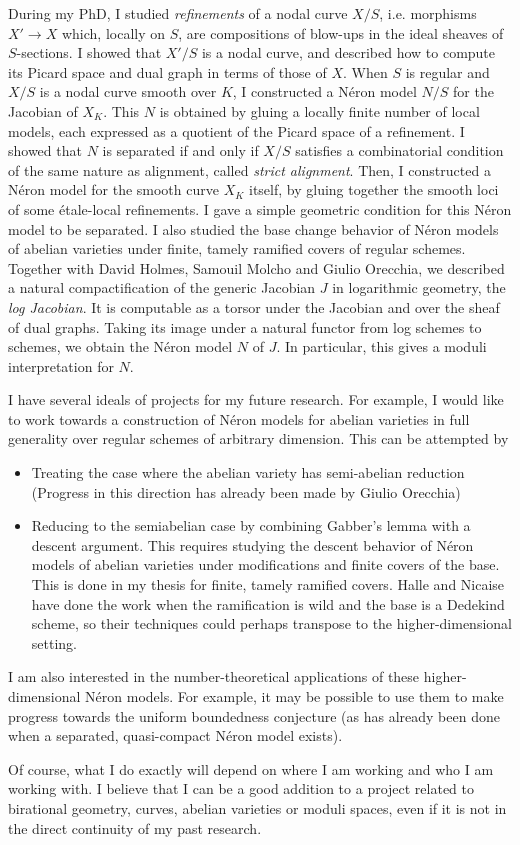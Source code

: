 \documentclass[12pt]{extarticle}
\begin{document}
During my PhD, I studied \emph{refinements} of a nodal curve $X/S$, i.e. morphisms $X' \to X$ which, locally on $S$, are compositions of blow-ups in the ideal sheaves of $S$-sections. I showed that $X'/S$ is a nodal curve, and described how to compute its Picard space and dual graph in terms of those of $X$. When $S$ is regular and $X/S$ is a nodal curve smooth over $K$, I constructed a Néron model $N/S$ for the Jacobian of $X_K$. This $N$ is obtained by gluing a locally finite number of local models, each expressed as a quotient of the Picard space of a refinement. I showed that $N$ is separated if and only if $X/S$ satisfies a combinatorial condition of the same nature as alignment, called \emph{strict alignment}. Then, I constructed a N\'eron model for the smooth curve $X_K$ itself, by gluing together the smooth loci of some \'etale-local refinements. I gave a simple geometric condition for this N\'eron model to be separated. I also studied the base change behavior of N\'eron models of abelian varieties under finite, tamely ramified covers of regular schemes. Together with David Holmes, Samouil Molcho and Giulio Orecchia, we described a natural compactification of the generic Jacobian $J$ in logarithmic geometry, the \emph{log Jacobian}. It is computable as a torsor under the Jacobian and over the sheaf of dual graphs. Taking its image under a natural functor from log schemes to schemes, we obtain the Néron model $N$ of $J$. In particular, this gives a moduli interpretation for $N$.


I have several ideals of projects for my future research. For example, I would like to work towards a construction of Néron models for abelian varieties in full generality over regular schemes of arbitrary dimension. This can be attempted by

\begin{itemize}
\item Treating the case where the abelian variety has semi-abelian reduction (Progress in this direction has already been made by Giulio Orecchia)
\item Reducing to the semiabelian case by combining Gabber's lemma with a descent argument. This requires studying the descent behavior of Néron models of abelian varieties under modifications and finite covers of the base. This is done in my thesis for finite, tamely ramified covers. Halle and Nicaise have done the work when the ramification is wild and the base is a Dedekind scheme, so their techniques could perhaps transpose to the higher-dimensional setting.
\end{itemize}

I am also interested in the number-theoretical applications of these higher-dimensional Néron models. For example, it may be possible to use them to make progress towards the uniform boundedness conjecture (as has already been done when a separated, quasi-compact Néron model exists).

Of course, what I do exactly will depend on where I am working and who I am working with. I believe that I can be a good addition to a project related to birational geometry, curves, abelian varieties or moduli spaces, even if it is not in the direct continuity of my past research.
\end{document}
